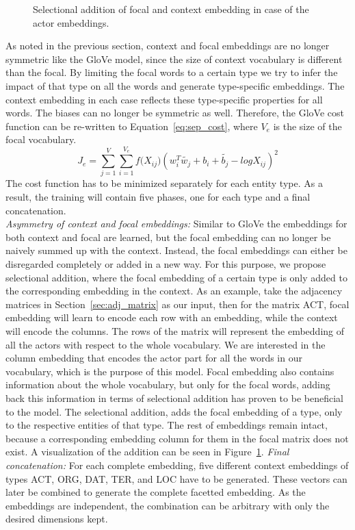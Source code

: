 \begin{figure}
{\small 
{} %

}
\caption{Selectional addition of focal and context embedding in case of the actor embeddings.} \label{fig:focal_addition}
\end{figure}
\noindent
As noted in the previous section, context and focal embeddings are no longer symmetric like the GloVe model, since the size of context vocabulary is different than the focal. 
By limiting the focal words to a certain type we try to infer the impact of that type on all the words and generate type-specific embeddings. The context embedding in each case reflects these type-specific properties for all words. The biases can no longer be symmetric as well. Therefore, the GloVe cost function can be re-written to Equation~\ref{eq:sep_cost}, where $V_e$ is the size of the focal vocabulary.
\begin{equation}
J_e=\sum _{ j=1 }^{ V }{}\sum _{ i=1 }^{ V_e }{ f({ X }_{ ij } } )(w_{ i }^{ T }\tilde{  w_{ j } } +b_{ i }+\tilde{  b_{ j } } -log{ X }_{ ij })^2
\label{eq:sep_cost}
\end{equation}
The cost function has to be minimized separately for each entity type. As a result, the training will contain five phases, one for each type and a final concatenation. \\
\noindent
\emph{Asymmetry of context and focal embeddings:} Similar to GloVe the embeddings for both context and focal are learned, but the focal embedding can no longer be naively summed up with the context. Instead, the focal embeddings can either be disregarded completely or added in a new way. For this purpose, we propose selectional addition, where the focal embedding of a certain type is only added to the corresponding embedding in the context. As an example, take the adjacency matrices in Section~\ref{sec:adj_matrix} as our input, then for the matrix ACT,  focal embedding will learn to encode each row with an embedding, while the context will encode the columns. The rows of the matrix will represent the embedding of all the actors with respect to the whole vocabulary. We are interested in the column embedding that encodes the actor part for all the words in our vocabulary, which is the purpose of this model. Focal embedding also contains information about the whole vocabulary, but only for the focal words, adding back this information in terms of selectional addition has proven to be beneficial to the model. The selectional addition, adds the focal embedding of a type, only to the respective entities of that type. The rest of embeddings remain intact, because a corresponding embedding column for them in the focal matrix does not exist. A visualization of the addition can be seen in Figure~\ref{fig:focal_addition}.
\noindent
\emph{Final concatenation:}  For each complete embedding, five different context embeddings of types ACT, ORG, DAT, TER, and LOC have to be generated. These vectors can later be combined to generate the complete facetted embedding. As the embeddings are independent, the combination can be arbitrary with only the desired dimensions kept. \\

